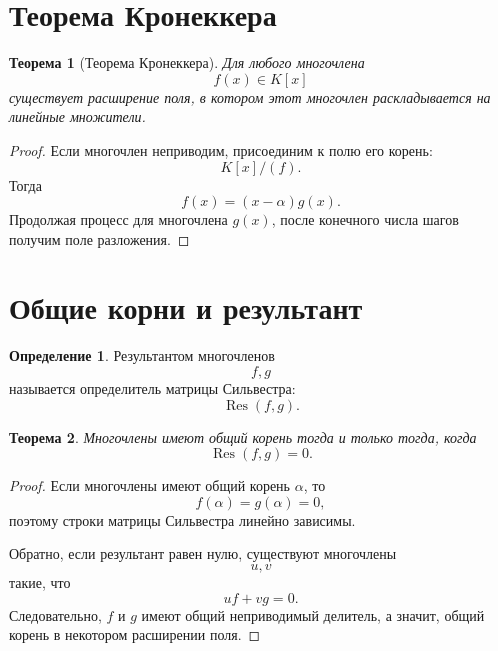 \documentclass[12pt, a4paper]{article}
\newtheorem{theorem}{Теорема}
\theoremstyle{definition}
\newtheorem{definition}{Определение}
\theoremstyle{remark}
\begin{document}
\section{Теорема Кронеккера}

\begin{theorem}[Теорема Кронеккера]
	Для любого многочлена
	\[
	f(x)\in K[x]
	\]
	существует расширение поля, в котором этот многочлен раскладывается на
	линейные множители.
\end{theorem}

\begin{proof}
	Если многочлен неприводим, присоединим к полю его корень:
	\[
	K[x]/(f).
	\]
	Тогда
	\[
	f(x)=(x-\alpha)g(x).
	\]
	Продолжая процесс для многочлена $g(x)$, после конечного числа шагов
	получим поле разложения.
\end{proof}

\section{Общие корни и результант}

\begin{definition}
	Результантом многочленов
	\[
	f,g
	\]
	называется определитель матрицы Сильвестра:
	\[
	\operatorname{Res}(f,g).
	\]
\end{definition}

\begin{theorem}
	Многочлены имеют общий корень тогда и только тогда, когда
	\[
	\operatorname{Res}(f,g)=0.
	\]
\end{theorem}

\begin{proof}
	Если многочлены имеют общий корень $\alpha$, то
	\[
	f(\alpha)=g(\alpha)=0,
	\]
	поэтому строки матрицы Сильвестра линейно зависимы.
	
	Обратно, если результант равен нулю, существуют многочлены
	\[
	u,v
	\]
	такие, что
	\[
	uf+vg=0.
	\]
	Следовательно, $f$ и $g$ имеют общий неприводимый делитель, а значит,
	общий корень в некотором расширении поля.
\end{proof}
\end{document}
